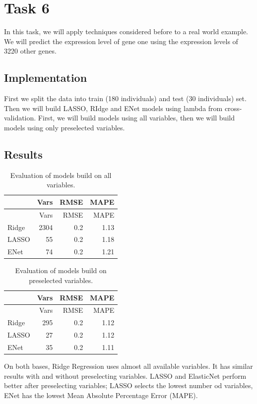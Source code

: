 \documentclass[
]{article}
\begin{document}
\hypertarget{task-6}{%
\section{Task 6}\label{task-6}}

In this task, we will apply techniques considered before to a real world
example. We will predict the expression level of gene one using the
expression levels of 3220 other genes.

\hypertarget{implementation}{%
\subsection{Implementation}\label{implementation}}

First we split the data into train (180 individuals) and test (30
individuals) set. Then we will build LASSO, RIdge and ENet models using
lambda from cross-validation. First, we will build models using all
variables, then we will build models using only preselected variables.

\hypertarget{results-3}{%
\subsection{Results}\label{results-3}}

\begin{longtable}[]{@{}lrrr@{}}
\caption{Evaluation of models build on all variables.}\tabularnewline
\toprule
& Vars & RMSE & MAPE \\
\midrule
\endfirsthead
\toprule
& Vars & RMSE & MAPE \\
\midrule
\endhead
Ridge & 2304 & 0.2 & 1.13 \\
LASSO & 55 & 0.2 & 1.18 \\
ENet & 74 & 0.2 & 1.21 \\
\bottomrule
\end{longtable}

\begin{longtable}[]{@{}lrrr@{}}
\caption{Evaluation of models build on preselected
variables.}\tabularnewline
\toprule
& Vars & RMSE & MAPE \\
\midrule
\endfirsthead
\toprule
& Vars & RMSE & MAPE \\
\midrule
\endhead
Ridge & 295 & 0.2 & 1.12 \\
LASSO & 27 & 0.2 & 1.12 \\
ENet & 35 & 0.2 & 1.11 \\
\bottomrule
\end{longtable}

On both bases, Ridge Regression uses almost all available variables. It
has similar results with and without preselecting variables. LASSO and
ElasticNet perform better after preselecting variables; LASSO selects
the lowest number od variables, ENet has the lowest Mean Absolute
Percentage Error (MAPE).
\end{document}
